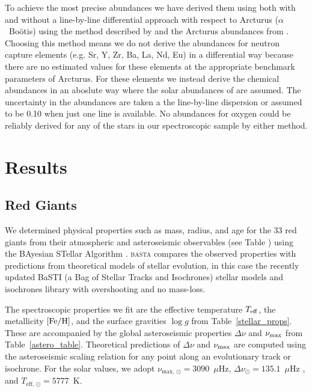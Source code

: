 \documentclass[a4paper,fleqn,usenatbib]{mnras}
\newcommand{\numax}{\mbox{$\nu_{\rm max}$}\xspace}
\newcommand{\Dnu}{\mbox{$\Delta \nu$}\xspace}
\newcommand{\teff}{\mbox{$T_{\rm eff}$}\xspace}
\newcommand{\logg}{\mbox{$\log g$}\xspace}
\newcommand{\feh}{\mbox{$\rm{[Fe/H]}$}\xspace}
\begin{document}
To achieve the most precise abundances we have derived them using both with and without a line-by-line differential approach with respect to Arcturus ($\alpha$~Bo\"{o}tis) using the method described by \citet{gaiabenchmark4} and the Arcturus abundances from \citep{hawkinsapogee}. Choosing this method means we do not derive the abundances for neutron capture  elements (e.g. Sr, Y, Zr, Ba, La, Nd, Eu) in a differential way because there are no estimated values for these elements at the appropriate benchmark parameters of Arcturus. For these elements we instead derive the chemical abundances in an aboslute way where the solar abundances of \cite{Asplund2005} are assumed. The uncertainty in the abundances are taken a the line-by-line dispersion or assumed to be 0.10 when just one line is available. No abundances for oxygen could be reliably derived for any of the stars in our spectroscopic sample by either method.







\section{Results}
\label{targets}

\subsection{Red Giants}
\label{rgs}

We determined physical properties such as mass, radius, and age for the 33 red giants from their atmospheric and asteroseismic observables (see Table ) using the BAyesian STellar Algorithm \citep[\textsc{basta}][]{silvaaguirre2015,silvaaguirre2017}. \textsc{basta} compares the observed properties with predictions from theoretical models of stellar evolution, in this case the recently updated BaSTI (a Bag of Stellar Tracks and Isochrones) stellar models and isochrones library \citep{Hidalgo:2018dy} with overshooting and no mass-loss.

The spectroscopic properties we fit are the effective temperature \teff, the metallicity \feh, and the surface gravities \logg from Table~\ref{stellar_props}. These are accompanied by the global asteroseismic properties \Dnu and \numax from Table~\ref{astero_table}. Theoretical predictions of \Dnu and \numax are computed using the asteroseismic scaling relation for any point along an evolutionary track or isochrone. For the solar values, we adopt $\nu_{\text{max, }\odot}=3090$~$\mu$Hz, $\Delta\nu_{\odot}=135.1$~$\mu$Hz \citep{huber2011}, and $T_{\text{eff, }\odot}=5777$~K.
\end{document}
